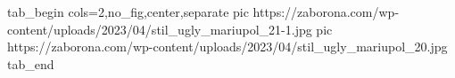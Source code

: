  
 
 
 
 


\ifcmt
  tab_begin cols=2,no_fig,center,separate
     pic https://zaborona.com/wp-content/uploads/2023/04/stil_ugly_mariupol_21-1.jpg
     pic https://zaborona.com/wp-content/uploads/2023/04/stil_ugly_mariupol_20.jpg
  tab_end
\fi
